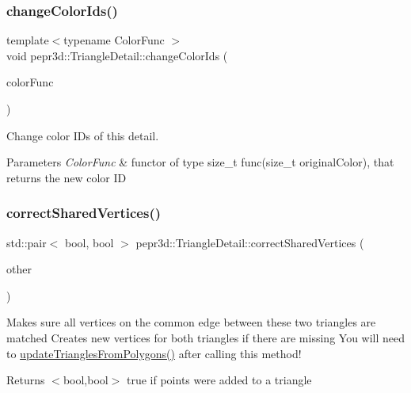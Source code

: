 \subsubsection{\texorpdfstring{changeColorIds()}{changeColorIds()}}
{\footnotesize\ttfamily template$<$typename Color\+Func $>$ \\
void pepr3d\+::\+Triangle\+Detail\+::change\+Color\+Ids (\begin{DoxyParamCaption}\item[{const Color\+Func \&}]{color\+Func }\end{DoxyParamCaption})\hspace{0.3cm}{\ttfamily [inline]}}



Change color I\+Ds of this detail. 


\begin{DoxyParams}{Parameters}
{\em Color\+Func} & functor of type size\+\_\+t func(size\+\_\+t original\+Color), that returns the new color ID \\
\hline
\end{DoxyParams}
\mbox{\label{classpepr3d_1_1_triangle_detail_a30215d8b668385e1f6c145545d9366f2}} 
\subsubsection{\texorpdfstring{correctSharedVertices()}{correctSharedVertices()}}
{\footnotesize\ttfamily std\+::pair$<$ bool, bool $>$ pepr3d\+::\+Triangle\+Detail\+::correct\+Shared\+Vertices (\begin{DoxyParamCaption}\item[{\mbox{\hyperlink{classpepr3d_1_1_triangle_detail}{Triangle\+Detail}} \&}]{other }\end{DoxyParamCaption})}



Makes sure all vertices on the common edge between these two triangles are matched Creates new vertices for both triangles if there are missing You will need to \mbox{\hyperlink{classpepr3d_1_1_triangle_detail_a55836364f8bca5dce29da4a7320adf65}{update\+Triangles\+From\+Polygons()}} after calling this method! 

\begin{DoxyReturn}{Returns}
$<$bool,bool$>$ true if points were added to a triangle 
\end{DoxyReturn}
\mbox{\label{classpepr3d_1_1_triangle_detail_a967a585a18caab0270893b3e757030d4}} 
